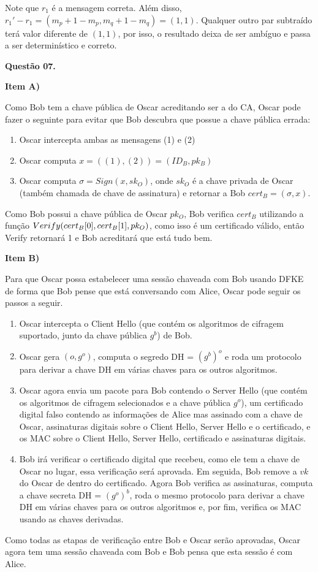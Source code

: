 \documentclass{article}
\begin{document}
Note que $r_1$ é a mensagem correta. Além disso, $r_1' - r_1 = (m_p +1 -m_p, m_q + 1 - m_q) = (1,1)$. Qualquer outro par subtraído terá valor diferente de $(1,1)$, por isso, o resultado deixa de ser ambíguo e passa a ser determinístico e correto.

\textbf{Questão 07.}

\textbf{Item A)}

Como Bob tem a chave pública de Oscar acreditando ser a do CA, Oscar pode fazer o seguinte para evitar que Bob descubra que possue a chave pública errada:

\begin{enumerate}
        \item Oscar intercepta ambas as mensagens (1) e (2)
        \item Oscar computa $x = ((1),(2)) = (ID_B, pk_B)$
        \item Oscar computa $\sigma = Sign(x, sk_O)$, onde $sk_O$ é a chave privada de Oscar (também chamada de chave de assinatura) e retornar a Bob $cert_B = (\sigma, x)$. 
\end{enumerate}

Como Bob possui a chave pública de Oscar $pk_O$, Bob verifica $cert_B$ utilizando a função $Verify(cert_B[0],\\ cert_B[1], pk_O)$, como isso é um certificado válido, então Verify retornará 1 e Bob acreditará que está tudo bem.

\textbf{Item B)}

Para que Oscar possa estabelecer uma sessão chaveada com Bob usando DFKE de forma que Bob pense que está conversando com Alice, Oscar pode seguir os passos a seguir.

\begin{enumerate}
        \item Oscar intercepta o Client Hello (que contém os algoritmos de cifragem suportado, junto da chave pública $g^b$) de Bob.
        \item Oscar gera $(o, g^o)$, computa o segredo DH = $(g^b)^o$ e roda um protocolo para derivar a chave DH em várias chaves para os outros algoritmos.
        \item Oscar agora envia um pacote para Bob contendo o Server Hello (que contém os algoritmos de cifragem selecionados e a chave pública $g^o$), um certificado digital falso contendo as informações de Alice mas assinado com a chave de Oscar, assinaturas digitais sobre o Client Hello, Server Hello e o certificado, e os MAC sobre o Client Hello, Server Hello, certificado e assinaturas digitais.
        \item Bob irá verificar o certificado digital que recebeu, como ele tem a chave de Oscar no lugar, essa verificação será aprovada. Em seguida, Bob remove a $vk$ do Oscar de dentro do certificado. Agora Bob verifica as assinaturas, computa a chave secreta DH = $(g^o)^b$, roda o mesmo protocolo para derivar a chave DH em várias chaves para os outros algoritmos e, por fim, verifica os MAC usando as chaves derivadas.
\end{enumerate}

Como todas as etapas de verificação entre Bob e Oscar serão aprovadas, Oscar agora tem uma sessão chaveada com Bob e Bob pensa que esta sessão é com Alice.
\end{document}
